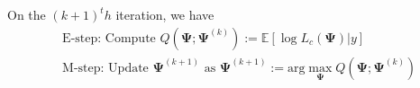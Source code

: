 \documentclass[
  12pt,
  letterpaper,
  DIV=11,
  numbers=noendperiod]{scrartcl}
\begin{document}
On the \((k+1)^th\) iteration, we have \begin{align*}
&\text{E-step: Compute } Q(\boldsymbol{\Psi};\boldsymbol{\Psi}^{(k)}):=\mathbb{E}[\log L_c(\boldsymbol{\Psi})|y]\\
&\text{M-step: Update }\boldsymbol{\Psi}^{(k+1)} \text{ as }\boldsymbol{{\Psi}}^{(k+1)}:=\text{arg}\max_\boldsymbol{\Psi} Q(\boldsymbol{\Psi};\boldsymbol{\Psi}^{(k)})
\end{align*}
\end{document}
